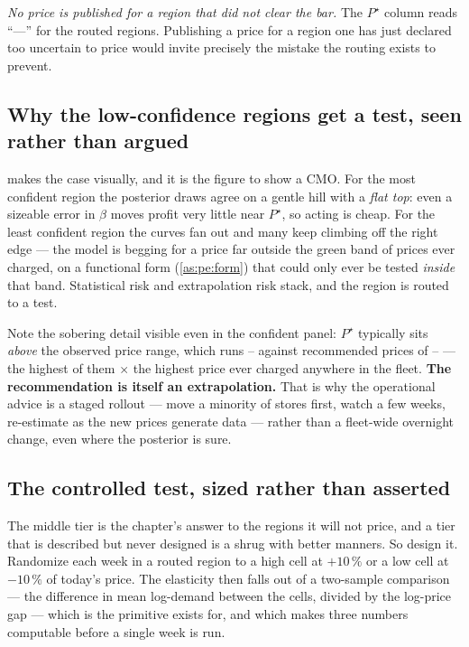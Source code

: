 \emph{No price is published for a region that did not clear the bar.} The $P^\star$ column reads
``---'' for the routed regions. Publishing a price for a region one has just declared too uncertain
to price would invite precisely the mistake the routing exists to prevent.

\subsection*{Why the low-confidence regions get a test, seen rather than argued}



 makes the case visually, and it is the figure to show a CMO. For the most
confident region the posterior draws agree on a gentle hill with a \emph{flat top}: even a sizeable
error in $\beta$ moves profit very little near $P^\star$, so acting is cheap. For the least
confident region the curves fan out and many keep climbing off the right edge --- the model is
begging for a price far outside the green band of prices ever charged, on a functional form
(\cref{as:pe:form}) that could only ever be tested \emph{inside} that band. Statistical risk and
extrapolation risk stack, and the region is routed to a test.

Note the sobering detail visible even in the confident panel: $P^\star$ typically sits
\emph{above} the observed price range, which runs \eur{\nbThreePriceObsLo}--\eur{\nbThreePriceObsHi}
against recommended prices of \eur{\nbThreePstarLo}--\eur{\nbThreePstarHi} --- the highest of them
\nbThreePstarOverBand$\times$ the highest price ever charged anywhere in the fleet. \textbf{The
recommendation is itself an extrapolation.} That is why the operational advice is a staged
rollout --- move a minority of stores first, watch a few weeks, re-estimate as the new prices
generate data --- rather than a fleet-wide overnight change, even where the posterior is sure.

\subsection*{The controlled test, sized rather than asserted}

The middle tier is the chapter's answer to the regions it will not price, and a tier that is
described but never designed is a shrug with better manners. So design it. Randomize each week in a
routed region to a high cell at $+10\,\%$ or a low cell at $-10\,\%$ of today's price. The
elasticity then falls out of a two-sample comparison --- the difference in mean log-demand between
the cells, divided by the log-price gap --- which is the primitive  exists for, and
which makes three numbers computable before a single week is run.

